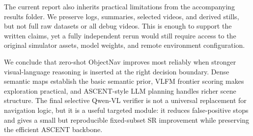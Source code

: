 \documentclass[10pt,twocolumn,letterpaper]{article}
\begin{document}
The current report also inherits practical limitations from the accompanying results folder. We preserve logs, summaries, selected videos, and derived stills, but not full raw datasets or all debug videos. This is enough to support the written claims, yet a fully independent rerun would still require access to the original simulator assets, model weights, and remote environment configuration.

We conclude that zero-shot ObjectNav improves most reliably when stronger visual-language reasoning is inserted at the right decision boundary. Dense semantic maps establish the basic semantic prior, VLFM frontier scoring makes exploration practical, and ASCENT-style LLM planning handles richer scene structure. The final selective Qwen-VL verifier is not a universal replacement for navigation logic, but it is a useful targeted module: it reduces false-positive stops and gives a small but reproducible fixed-subset SR improvement while preserving the efficient ASCENT backbone.

\clearpage
{\small


}
\end{document}
